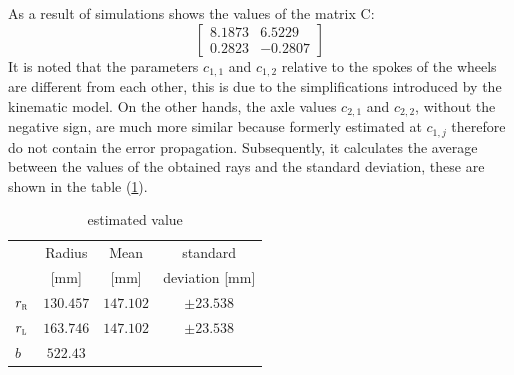  As a result of simulations shows the values of the matrix C:
\begin{equation}
\label{eq:Cresult}
	\begin{bmatrix}
		8.1873  &  6.5229\\
    	0.2823 &  -0.2807
	\end{bmatrix}
\end{equation}
It is noted that the parameters $c_ {1,1}$ and $c_ {1,2}$ relative to the spokes of the wheels are different from each other, this is due to the simplifications introduced by the kinematic model. On the other hands, the axle values $c_ {2,1}$ and $c_ {2,2}$, without the negative sign, are much more similar because formerly estimated at $c_{1,j}$ therefore do not contain the error propagation.
Subsequently, it calculates the average between the values of the obtained rays and the standard deviation, these are shown in the table (\ref{tab:recapvalue}).
\begin{table}[!h]
\centering
	\begin{tabular}{lccc}
		\hline
								& Radius 	& Mean 	& standard  \\
								&	[mm]	& [mm]	& deviation [mm]\\
		\hline
		$r_\textsc{r}$	&	$130.457$		& $147.102	$		&	$\pm23.538$\\
		$r_\textsc{l}$	&	$163.746$		& $147.102	$		&	$\pm23.538$\\
		$b$					&	$522.43$\\
		\hline
\end{tabular}
\caption{estimated value}
\label{tab:recapvalue}
\end{table}
%
%

